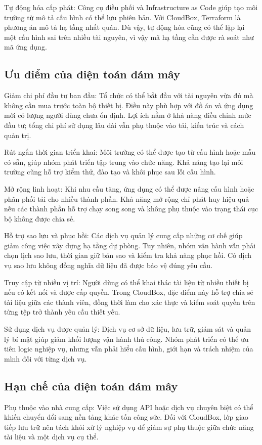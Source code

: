 Tự động hóa cấp phát: Công cụ điều phối và Infrastructure as Code giúp tạo môi trường từ mô tả cấu hình có thể lưu phiên bản. Với CloudBox, Terraform là phương án mô tả hạ tầng nhất quán. Dù vậy, tự động hóa cũng có thể lặp lại một cấu hình sai trên nhiều tài nguyên, vì vậy mã hạ tầng cần được rà soát như mã ứng dụng.

\subsection{Ưu điểm của điện toán đám mây}
Giảm chi phí đầu tư ban đầu: Tổ chức có thể bắt đầu với tài nguyên vừa đủ mà không cần mua trước toàn bộ thiết bị. Điều này phù hợp với đồ án và ứng dụng mới có lượng người dùng chưa ổn định. Lợi ích nằm ở khả năng điều chỉnh mức đầu tư; tổng chi phí sử dụng lâu dài vẫn phụ thuộc vào tải, kiến trúc và cách quản trị.

Rút ngắn thời gian triển khai: Môi trường có thể được tạo từ cấu hình hoặc mẫu có sẵn, giúp nhóm phát triển tập trung vào chức năng. Khả năng tạo lại môi trường cũng hỗ trợ kiểm thử, đào tạo và khôi phục sau lỗi cấu hình.

Mở rộng linh hoạt: Khi nhu cầu tăng, ứng dụng có thể được nâng cấu hình hoặc phân phối tải cho nhiều thành phần. Khả năng mở rộng chỉ phát huy hiệu quả nếu các thành phần hỗ trợ chạy song song và không phụ thuộc vào trạng thái cục bộ không được chia sẻ.

Hỗ trợ sao lưu và phục hồi: Các dịch vụ quản lý cung cấp những cơ chế giúp giảm công việc xây dựng hạ tầng dự phòng. Tuy nhiên, nhóm vận hành vẫn phải chọn lịch sao lưu, thời gian giữ bản sao và kiểm tra khả năng phục hồi. Có dịch vụ sao lưu không đồng nghĩa dữ liệu đã được bảo vệ đúng yêu cầu.

Truy cập từ nhiều vị trí: Người dùng có thể khai thác tài liệu từ nhiều thiết bị nếu có kết nối và được cấp quyền. Trong CloudBox, đặc điểm này hỗ trợ chia sẻ tài liệu giữa các thành viên, đồng thời làm cho xác thực và kiểm soát quyền trên từng tệp trở thành yêu cầu thiết yếu.

Sử dụng dịch vụ được quản lý: Dịch vụ cơ sở dữ liệu, lưu trữ, giám sát và quản lý bí mật giúp giảm khối lượng vận hành thủ công. Nhóm phát triển có thể ưu tiên logic nghiệp vụ, nhưng vẫn phải hiểu cấu hình, giới hạn và trách nhiệm của mình đối với từng dịch vụ.

\subsection{Hạn chế của điện toán đám mây}
Phụ thuộc vào nhà cung cấp: Việc sử dụng API hoặc dịch vụ chuyên biệt có thể khiến chuyển đổi sang nền tảng khác tốn công sức. Đối với CloudBox, lớp giao tiếp lưu trữ nên tách khỏi xử lý nghiệp vụ để giảm sự phụ thuộc giữa chức năng tài liệu và một dịch vụ cụ thể.

